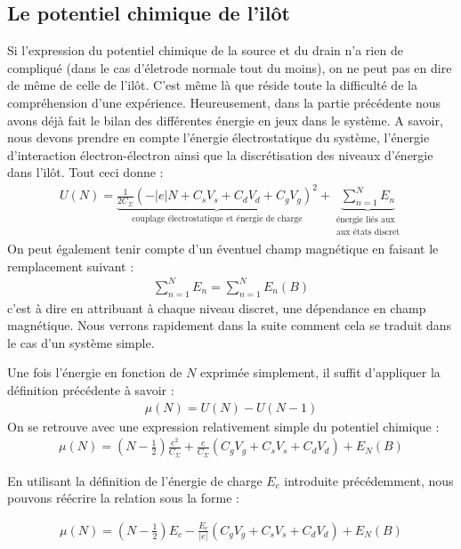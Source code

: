 \subsection{Le potentiel chimique de l'il\^ot}
Si l'expression du potentiel chimique de la source et du drain n'a rien de compliqué (dans le cas d'életrode normale tout du moins), on ne peut pas en dire de m\^eme de celle de l'il\^ot. C'est m\^eme là que réside toute la difficulté de la compréhension d'une expérience. Heureusement, dans la partie précédente nous avons déjà fait le bilan des différentes énergie en jeux dans le système. A savoir, nous devons prendre en compte l'énergie électrostatique du système, l'énergie d'interaction électron-électron ainsi que la discrétisation des niveaux d'énergie dans l'il\^ot. Tout ceci donne :
\begin{eqnarray}
U(N) = \underbrace{\frac{1}{2C_{\Sigma}} (-|e|N + C_sV_s + C_dV_d + C_gV_g)^2}_{\text{couplage électrostatique et énergie de charge}}
+ 
\underbrace{\sum_{n=1}^{N} E_n}_{\substack{\text{énergie liés aux} \\\text{aux états discret}}}
\end{eqnarray}
On peut également tenir compte d'un éventuel champ magnétique en faisant le remplacement suivant :
\begin{eqnarray}
\sum_{n=1}^N E_n = \sum_{n=1}^N E_n(B) \nonumber
\end{eqnarray}
c'est à dire en attribuant à chaque niveau discret, une dépendance en champ magnétique. Nous verrons rapidement dans la suite comment cela se traduit dans le cas d'un système simple. 

Une fois l'énergie en fonction de $N$ exprimée simplement, il suffit d'appliquer la définition précédente à savoir :
\begin{eqnarray}
\mu(N) = U(N) - U(N-1) \nonumber
\end{eqnarray}
On se retrouve avec une expression relativement simple du potentiel chimique :
\begin{eqnarray}
\mu(N) = (N-\frac{1}{2})\frac{e^2}{C_{\Sigma}}
+ 
\frac{e}{C_{\Sigma}}(C_gV_g + C_sV_s + C_dV_d)
+
E_N(B)
\end{eqnarray}

En utilisant la définition de l'énergie de charge $E_c$ introduite précédemment, nous pouvons réécrire la relation sous la forme :

\begin{eqnarray}
\mu(N) = (N-\frac{1}{2})E_c
- 
\frac{E_c}{|e|}(C_gV_g + C_sV_s + C_dV_d)
+
E_N(B)
\label{pot_chim}
\end{eqnarray}


